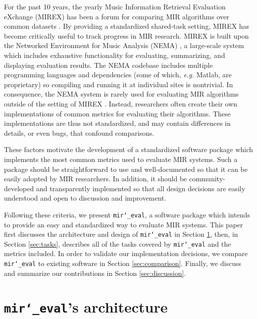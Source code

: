 \documentclass{article}
\def\eg{\emph{e.g.}}
\def\mireval{\texttt{mir\char`_eval}}
\begin{document}
For the past 10 years, the yearly Music Information Retrieval Evaluation eXchange (MIREX) has been a forum for comparing MIR algorithms over common datasets \cite{downie2008music}.
By providing a standardized shared-task setting, MIREX has become critically useful to track progress in MIR research.
MIREX is built upon the Networked Environment for Music Analysis (NEMA) \cite{west2010networked}, a large-scale system which includes exhaustive functionality for evaluating, summarizing, and displaying evaluation results.
The NEMA codebase includes multiple programming languages and dependencies (some of which, \eg{} Matlab, are proprietary) so compiling and running it at individual sites is nontrivial. 
%
In consequence, the NEMA system is rarely used for evaluating MIR algorithms outside of the setting of MIREX \cite{downie2008music}.
Instead, researchers often create their own implementations of common metrics for evaluating their algorithms.
These implementations are thus not standardized, and may contain differences in details, or even bugs, that confound comparisons.

These factors motivate the development of a standardized software package which implements the most common metrics used to evaluate MIR systems.
Such a package should be straightforward to use and well-documented so that it can be easily adopted by MIR researchers.
In addition, it should be community-developed and transparently implemented so that all design decisions are easily understood and open to discussion and improvement.

Following these criteria, we present \mireval{}, a software package which intends to provide an easy and standardized way to evaluate MIR systems.
This paper first discusses the architecture and design of \mireval{} in Section \ref{sec:architecture}, then, in Section \ref{sec:tasks}, describes all of the tasks covered by \mireval{} and the metrics included.
In order to validate our implementation decisions, we compare \mireval{} to existing software in Section \ref{sec:comparison}.
Finally, we discuss and summarize our contributions in Section \ref{sec:discussion}.

\section{\mireval{}'s architecture}
\label{sec:architecture}
\end{document}

